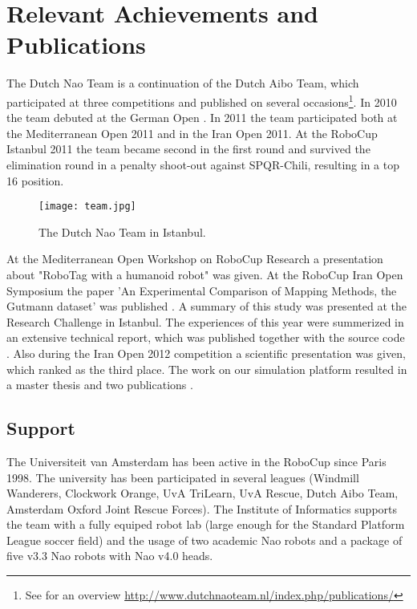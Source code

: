 \documentclass[11pt]{llncs}
\begin{document}
\section{Relevant Achievements and Publications}
The Dutch Nao Team is a continuation of the Dutch Aibo Team, which participated at three competitions and published on several occasions\footnote{See for an overview \url{http://www.dutchnaoteam.nl/index.php/publications/}}. 
In 2010 the team debuted at the German Open \cite{DutchNaoTeamTDP2010}. In 2011 the team participated both at the Mediterranean Open 2011 and in the Iran Open 2011.
 At the RoboCup Istanbul 2011 the team became second in the first round and survived the elimination round in a penalty shoot-out against SPQR-Chili, resulting in a top 16 position. 

\begin{figure}[!ht]
  \centering
  \texttt{[image: team.jpg]}
  \caption{The Dutch Nao Team in Istanbul.}
\label{fig:team}
\end{figure}

At the Mediterranean Open Workshop on RoboCup Research a presentation about "RoboTag with a humanoid robot" was given.
At the RoboCup Iran Open Symposium the paper 'An Experimental Comparison of Mapping Methods, the Gutmann dataset' was published \cite{Visser2011rios}. A summary of this study was presented at the Research Challenge in Istanbul.
The experiences of this year were summerized in an extensive technical report, which was published together with the source code \cite{DNT2011release}.
Also during the Iran Open 2012 competition a scientific presentation was given, which ranked as the third place. The work on our simulation platform resulted
in a master thesis \cite{vanNoort2012msc} and two publications \cite{vanNoort2012permis,vanNoort2012robocup}.

\subsection*{Support}
The Universiteit van Amsterdam has been active in the RoboCup since Paris 1998. The university has been participated in several leagues (Windmill Wanderers, Clockwork Orange, UvA TriLearn, UvA Rescue, Dutch Aibo Team, Amsterdam Oxford Joint Rescue Forces).
The Institute of Informatics supports the team with a fully equiped robot lab (large enough for the Standard Platform League soccer field) and the usage of two academic Nao robots and a package of five v3.3 Nao robots with Nao v4.0 heads.
\end{document}
